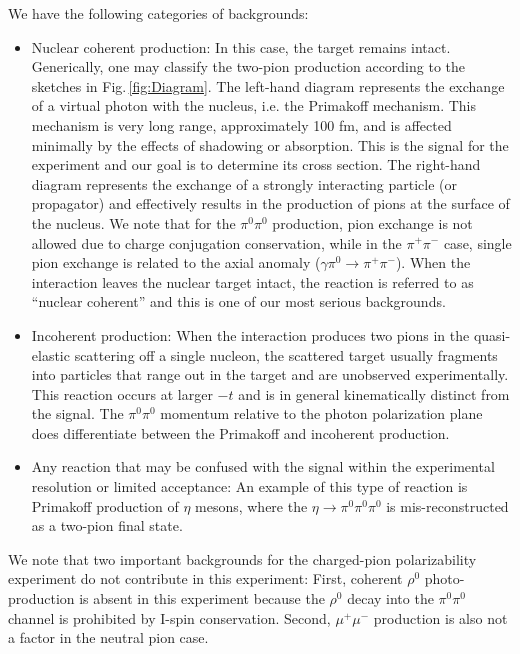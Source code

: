 We have the following categories of backgrounds:
\begin{itemize}
\item Nuclear coherent production: In this case, the target remains
  intact. Generically, one may classify the two-pion production
  according to the sketches in Fig.\,\ref{fig:Diagram}. The left-hand
  diagram represents the exchange of a virtual photon with the
  nucleus, i.e. the Primakoff mechanism. This mechanism is very long
  range, approximately 100 fm, and is affected minimally by the
  effects of shadowing or absorption.  This is the signal for the
  experiment and our goal is to determine its cross section.  The
  right-hand diagram represents the exchange of a strongly interacting
  particle (or propagator) and effectively results in the production
  of pions at the surface of the nucleus. We note that for the
  $\pi^0\pi^0$ production, pion exchange is not allowed due to charge
  conjugation conservation, while in the $\pi^+\pi^-$ case, single
  pion exchange is related to the axial anomaly ($\gamma \pi^0
  \rightarrow \pi^+ \pi^-$).  When the interaction leaves the nuclear
  target intact, the reaction is referred to as ``nuclear coherent''
  and this is one of our most serious backgrounds.
\item Incoherent production: When the interaction produces two pions
  in the quasi-elastic scattering off a single nucleon, the scattered
  target usually fragments into particles that range out in the target
  and are unobserved experimentally. This reaction occurs at larger
  $-t$ and is in general kinematically distinct from the signal. The
  $\pi^0\pi^0$ momentum relative to the photon polarization plane does
  differentiate between the Primakoff and incoherent production.
\item Any reaction that may be confused with the signal within the
  experimental resolution or limited acceptance: An example of this
  type of reaction is Primakoff production of $\eta$ mesons, where the
  $\eta\rightarrow \pi^0 \pi^0 \pi^0$ is mis-reconstructed as a
  two-pion final state.
\end{itemize}

We note that two important backgrounds for the charged-pion
polarizability experiment do not contribute in this experiment: First,
coherent $\rho^0$ photo-production is absent in this experiment
because the $\rho^0$ decay into the $\pi^0\pi^0$ channel is prohibited
by I-spin conservation.  Second, $\mu^+\mu^-$ production is also not a
factor in the neutral pion case.

